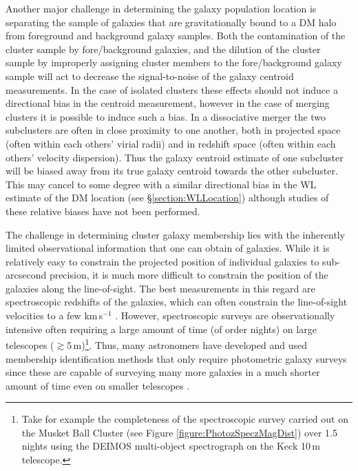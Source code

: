 Another major challenge in determining the galaxy population location is separating the sample of galaxies that are gravitationally bound to a DM halo from foreground and background galaxy samples.
Both the contamination of the cluster sample by fore/background galaxies, and the dilution of the cluster sample by improperly assigning cluster members to the fore/background galaxy sample will act to decrease the signal-to-noise of the galaxy centroid measurements.
In the case of isolated clusters these effects should not induce a directional bias in the centroid measurement, however in the case of merging clusters it is possible to induce such a bias.
In a dissociative merger the two subclusters are often in close proximity to one another, both in projected space (often within each others' virial radii) and in redshift space (often within each others' velocity dispersion).
Thus the galaxy centroid estimate of one subcluster will be biased away from its true galaxy centroid towards the other subcluster.
This may cancel to some degree with a similar directional bias in the WL estimate of the DM location (see \S\ref{section:WLLocation}) although studies of these relative biases have not been performed.  

The challenge in determining cluster galaxy membership lies with the inherently limited observational information that one can obtain of galaxies.
While it is relatively easy to constrain the projected position of individual galaxies to sub-arcsecond precision, it is much more difficult to constrain the position of the galaxies along the line-of-sight.
The best measurements in this regard are spectroscopic redshifts of the galaxies, which can often constrain the line-of-sight velocities to a few km\,s$^{-1}$ \citep[in the case of a 1200 line mm$^{-1}$ grating with resulting resolution of $\sim 1\,\AA$; see e.g.][]{Dawson:2012ub}.
However, spectroscopic surveys are observationally intensive often requiring a large amount of time (of order nights) on large telescopes ($\gtrsim$5\,m)\footnote{Take for example the completeness of the spectroscopic survey carried out on the Musket Ball Cluster (see Figure \ref{figure:PhotozSpeczMagDist}) over 1.5 nights using the DEIMOS multi-object spectrograph on the Keck 10\,m telescope.}.
Thus, many astronomers have developed and used membership identification methods that only require photometric galaxy surveys since these are capable of surveying many more galaxies in a much shorter amount of time even on smaller telescopes \citep[e.g.\,the DLS,][]{Wittman:2002cp}. 

